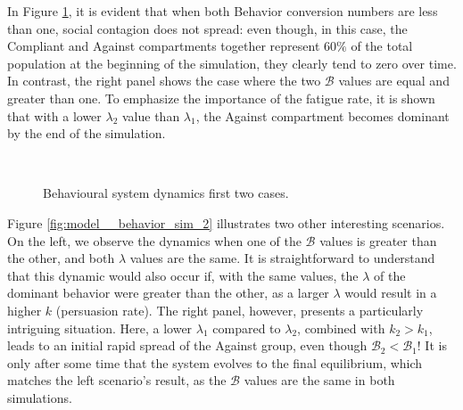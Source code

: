 In Figure \ref{fig:model__behavior_sim_1}, it is evident that when both Behavior conversion numbers are less than one, social contagion does not spread: even though, in this case, the Compliant and Against compartments together represent $60\%$ of the total population at the beginning of the simulation, they clearly tend to zero over time. In contrast, the right panel shows the case where the two $\mathcal{B}$ values are equal and greater than one. To emphasize the importance of the fatigue rate, it is shown that with a lower $\lambda_2$ value than $\lambda_1$, the Against compartment becomes dominant by the end of the simulation. 
\begin{figure}[h]
	\centering
	 \quad
	 \\
	\caption[Behavioural model simulation first]{Behavioural system dynamics first two cases.}
	\label{fig:model__behavior_sim_1}
\end{figure}

Figure \ref{fig:model__behavior_sim_2} illustrates two other interesting scenarios. On the left, we observe the dynamics when one of the $\mathcal{B}$ values is greater than the other, and both $\lambda$ values are the same. It is straightforward to understand that this dynamic would also occur if, with the same values, the $\lambda$ of the dominant behavior were greater than the other, as a larger $\lambda$ would result in a higher $k$ (persuasion rate). The right panel, however, presents a particularly intriguing situation. Here, a lower $\lambda_1$ compared to $\lambda_2$, combined with $k_2 > k_1$, leads to an initial rapid spread of the Against group, even though $\mathcal{B}_2 < \mathcal{B}_1$! It is only after some time that the system evolves to the final equilibrium, which matches the left scenario's result, as the $\mathcal{B}$ values are the same in both simulations.

